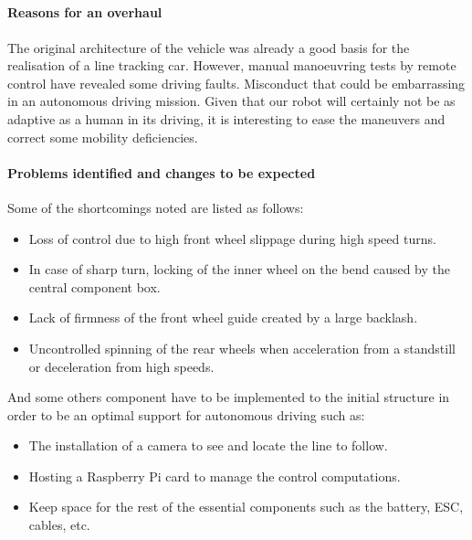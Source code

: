 \subsection{}
\paragraph{Reasons for an overhaul}
The original architecture of the vehicle was already a good basis for the
realisation of a line tracking car. However, manual manoeuvring tests by
remote control have revealed some driving faults. Misconduct that could
be embarrassing in an autonomous driving mission. Given that our robot
will certainly not be as adaptive as a human in its driving, it is
interesting to ease the maneuvers and correct some mobility deficiencies.

\paragraph{Problems identified and changes to be expected}
Some of the shortcomings noted are listed as follows:
\begin{itemize}
    \item Loss of control due to high front wheel slippage during high speed turns.
    \item In case of sharp turn, locking of the inner wheel on the bend caused by
    the central component box.
    \item Lack of firmness of the front wheel guide created by a large backlash.
    \item Uncontrolled spinning of the rear wheels when acceleration from a
    standstill or deceleration from high speeds.
\end{itemize}
And some others component have to be implemented to the initial structure in order
to be an optimal support for autonomous driving such as:
\begin{itemize}
    \item The installation of a camera to see and locate the line to follow.
    \item Hosting a Raspberry Pi card to manage the control computations.
    \item Keep space for the rest of the essential components such as the battery,
    ESC, cables, etc.
\end{itemize}


